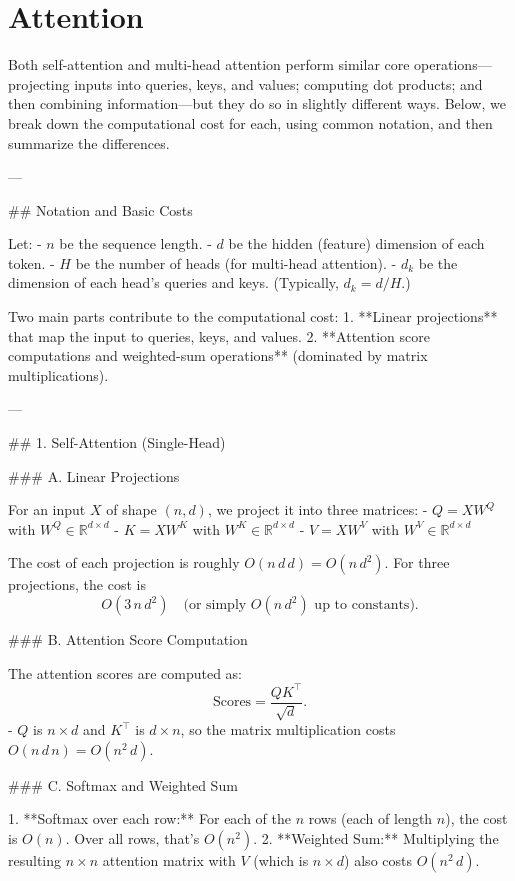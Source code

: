 \chapter{Attention}

Both self-attention and multi-head attention perform similar core operations—projecting inputs into queries, keys, and values; computing dot products; and then combining information—but they do so in slightly different ways. Below, we break down the computational cost for each, using common notation, and then summarize the differences.

---

## Notation and Basic Costs

Let:
- \( n \) be the sequence length.
- \( d \) be the hidden (feature) dimension of each token.
- \( H \) be the number of heads (for multi-head attention).
- \( d_k \) be the dimension of each head’s queries and keys. (Typically, \( d_k = d / H \).)

Two main parts contribute to the computational cost:
1. **Linear projections** that map the input to queries, keys, and values.
2. **Attention score computations and weighted-sum operations** (dominated by matrix multiplications).

---

## 1. Self-Attention (Single-Head)

### A. Linear Projections

For an input \( X \) of shape \((n, d)\), we project it into three matrices:
- \( Q = X W^Q \) with \( W^Q \in \mathbb{R}^{d \times d} \)
- \( K = X W^K \) with \( W^K \in \mathbb{R}^{d \times d} \)
- \( V = X W^V \) with \( W^V \in \mathbb{R}^{d \times d} \)

The cost of each projection is roughly \( O(n \, d \, d) = O(n\, d^2) \). For three projections, the cost is
\[
O(3 \, n\, d^2) \quad \text{(or simply } O(n\, d^2) \text{ up to constants).}
\]

### B. Attention Score Computation

The attention scores are computed as:
\[
\text{Scores} = \frac{QK^\top}{\sqrt{d}}.
\]
- \( Q \) is \( n \times d \) and \( K^\top \) is \( d \times n \), so the matrix multiplication costs \( O(n \, d \, n) = O(n^2\, d) \).

### C. Softmax and Weighted Sum

1. **Softmax over each row:**  
   For each of the \( n \) rows (each of length \( n \)), the cost is \( O(n) \). Over all rows, that’s \( O(n^2) \).  
2. **Weighted Sum:**  
   Multiplying the resulting \( n \times n \) attention matrix with \( V \) (which is \( n \times d \)) also costs \( O(n^2\, d) \).

